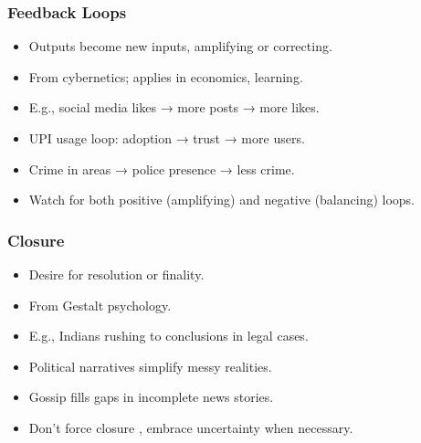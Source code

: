 \begin{frame}[fragile]\frametitle{Feedback Loops}
  \begin{itemize}
    \item Outputs become new inputs, amplifying or correcting.
    \item From cybernetics; applies in economics, learning.
    \item E.g., social media likes → more posts → more likes.
    \item UPI usage loop: adoption → trust → more users.
    \item Crime in areas → police presence → less crime.
    \item Watch for both positive (amplifying) and negative (balancing) loops.
  \end{itemize}
\end{frame}

\begin{frame}[fragile]\frametitle{Closure}
  \begin{itemize}
    \item Desire for resolution or finality.
    \item From Gestalt psychology.
    \item E.g., Indians rushing to conclusions in legal cases.
    \item Political narratives simplify messy realities.
    \item Gossip fills gaps in incomplete news stories.
    \item Don't force closure , embrace uncertainty when necessary.
  \end{itemize}
\end{frame}